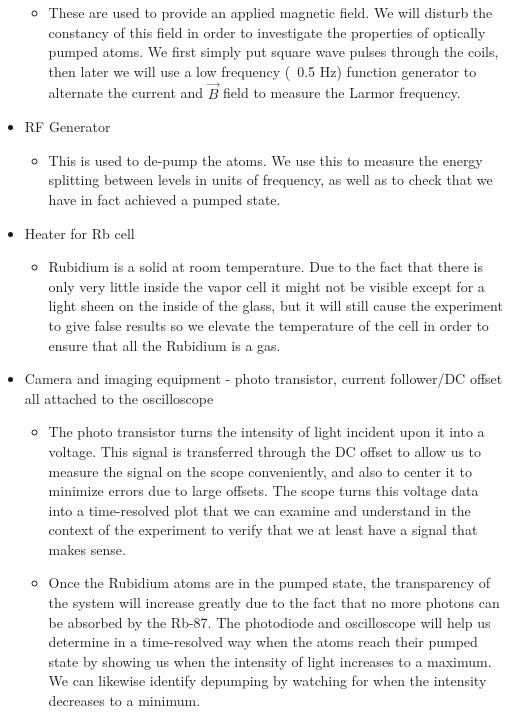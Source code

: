 \documentclass{article}
\begin{document}
\begin{itemize}
\begin{itemize}
      \item These are used to provide an applied magnetic field.  We will disturb the constancy of this field in order to investigate the properties of optically pumped atoms.  We first simply put square wave pulses through the coils, then later we will use a low frequency (~0.5 Hz) function generator to alternate the current and $\vec{B}$ field to measure the Larmor frequency.
    \end{itemize}
    \item RF Generator
    \begin{itemize}
      \item This is used to de-pump the atoms.  We use this to measure the energy splitting between levels in units of frequency, as well as to check that we have in fact achieved a pumped state.
    \end{itemize}
    \item Heater for Rb cell
    \begin{itemize}
      \item Rubidium is a solid at room temperature.  Due to the fact that there is only very little inside the vapor cell it might not be visible except for a light sheen on the inside of the glass, but it will still cause the experiment to give false results so we elevate the temperature of the cell in order to ensure that all the Rubidium is a gas.
    \end{itemize}
    \item Camera and imaging equipment - photo transistor, current follower/DC offset all attached to the oscilloscope
    \begin{itemize}
      \item The photo transistor turns the intensity of light incident upon it into a voltage.  This signal is transferred through the DC offset to allow us to measure the signal on the scope conveniently, and also to center it to minimize errors due to large offsets.  The scope turns this voltage data into a time-resolved plot that we can examine and understand in the context of the experiment to verify that we at least have a signal that makes sense.
      \item Once the Rubidium atoms are in the pumped state, the transparency of the system will increase greatly due to the fact that no more photons can be absorbed by the Rb-87.  The photodiode and oscilloscope will help us determine in a time-resolved way when the atoms reach their pumped state by showing us when the intensity of light increases to a maximum.  We can likewise identify depumping by watching for when the intensity decreases to a minimum.
    \end{itemize}
  \end{itemize}
\end{document}
